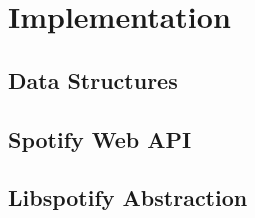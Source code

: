 \chapter{Implementation}




\section{Data Structures}




\section{Spotify Web API}


\section{Libspotify Abstraction}

